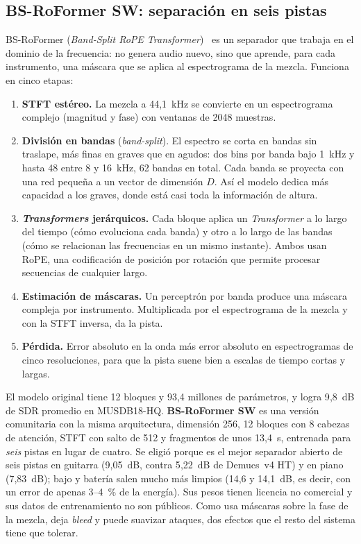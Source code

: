 \documentclass[11pt,a4paper]{article}
\begin{document}
\subsection{BS-RoFormer SW: separación en seis pistas}
BS-RoFormer (\emph{Band-Split RoPE Transformer})~\cite{lu2023bsroformer} es un separador que trabaja en
el dominio de la frecuencia: no genera audio nuevo, sino que aprende, para cada instrumento, una máscara
que se aplica al espectrograma de la mezcla. Funciona en cinco etapas:
\begin{enumerate}[leftmargin=1.5em]
\item \textbf{STFT estéreo.} La mezcla a 44{,}1~kHz se convierte en un espectrograma complejo (magnitud y
fase) con ventanas de 2048 muestras.
\item \textbf{División en bandas} (\emph{band-split}). El espectro se corta en bandas sin traslape, más
finas en graves que en agudos: dos bins por banda bajo 1~kHz y hasta 48 entre 8 y 16~kHz, 62 bandas en
total. Cada banda se proyecta con una red pequeña a un vector de dimensión $D$. Así el modelo dedica más
capacidad a los graves, donde está casi toda la información de altura.
\item \textbf{\emph{Transformers} jerárquicos.} Cada bloque aplica un \emph{Transformer} a lo largo del
tiempo (cómo evoluciona cada banda) y otro a lo largo de las bandas (cómo se relacionan las frecuencias
en un mismo instante). Ambos usan RoPE, una codificación de posición por rotación que permite procesar
secuencias de cualquier largo.
\item \textbf{Estimación de máscaras.} Un perceptrón por banda produce una máscara compleja por
instrumento. Multiplicada por el espectrograma de la mezcla y con la STFT inversa, da la pista.
\item \textbf{Pérdida.} Error absoluto en la onda más error absoluto en espectrogramas de cinco
resoluciones, para que la pista suene bien a escalas de tiempo cortas y largas.
\end{enumerate}
El modelo original tiene 12 bloques y 93{,}4 millones de parámetros, y logra 9{,}8~dB de SDR promedio en
MUSDB18-HQ. \textbf{BS-RoFormer SW} es una versión comunitaria con la misma arquitectura, dimensión 256,
12 bloques con 8 cabezas de atención, STFT con salto de 512 y fragmentos de unos 13{,}4~s, entrenada para
\emph{seis} pistas en lugar de cuatro. Se eligió porque es el mejor separador abierto de seis pistas en
guitarra (9{,}05~dB, contra 5{,}22~dB de Demucs~v4 HT) y en piano (7{,}83~dB); bajo y batería salen mucho más
limpios (14{,}6 y 14{,}1~dB, es decir, con un error de apenas 3--4~\% de la energía). Sus pesos tienen
licencia no comercial y sus datos de entrenamiento no son públicos. Como usa máscaras sobre la fase de
la mezcla, deja \emph{bleed} y puede suavizar ataques, dos efectos que el resto del sistema tiene que
tolerar.
\end{document}
